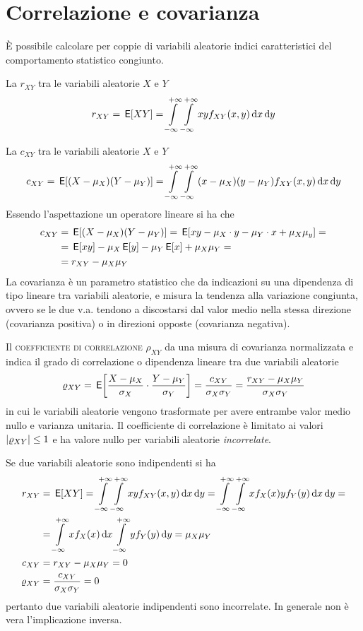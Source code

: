\section{Correlazione e covarianza}
\`{E} possibile calcolare per coppie di variabili aleatorie indici caratteristici del comportamento statistico congiunto.

La  $r_{XY}$ tra le variabili aleatorie $X$ e $Y$
\begin{equation}\label{eq:v_a_correlazione}
r_{XY}=\,{\operatorname{\mathsf{E}}}\!\left[{X Y}\right]=\int\limits_{-\infty}^{+\infty}{\int\limits_{-\infty}^{+\infty}{x y f_{XY}(x,y)}{\,\mathop{}\!\mathrm{d}{x}}}{\,\mathop{}\!\mathrm{d}{y}}
\end{equation}

La  $c_{XY}$ tra le variabili aleatorie $X$ e $Y$
\begin{equation}\label{eq:v_a_covarianza}
c_{XY}=\,{\operatorname{\mathsf{E}}}\!\left[{(X-\mu_X)(Y-\mu_Y)}\right]=\int\limits_{-\infty}^{+\infty}{\int\limits_{-\infty}^{+\infty}{(x-\mu_X)(y-\mu_Y)f_{XY}(x,y)}{\,\mathop{}\!\mathrm{d}{x}}}{\,\mathop{}\!\mathrm{d}{y}}
\end{equation}
Essendo l'aspettazione un operatore lineare si ha che
\begin{equation}\begin{split}
c_{XY}&=\,{\operatorname{\mathsf{E}}}\!\left[{(X-\mu_X)(Y-\mu_Y)}\right]=\,{\operatorname{\mathsf{E}}}\!\left[{x y-\mu_X\cdot y-\mu_Y\cdot x+\mu_X\mu_y}\right]=\\
&=\,{\operatorname{\mathsf{E}}}\!\left[{x y}\right]-\mu_X \,{\operatorname{\mathsf{E}}}\!\left[{y}\right]-\mu_Y \,{\operatorname{\mathsf{E}}}\!\left[{x}\right]+\mu_X\mu_Y=\\&=r_{XY}-\mu_X\mu_Y\end{split}\end{equation}
La covarianza è un parametro statistico che da indicazioni su una dipendenza di tipo lineare tra variabili aleatorie, e misura la tendenza alla variazione congiunta, ovvero se le due v.a. tendono a discostarsi dal valor medio nella stessa direzione (covarianza positiva) o in direzioni opposte (covarianza negativa).

Il \textsc{coefficiente di correlazione} $\rho_{XY}$ da una misura di covarianza normalizzata e indica il grado di correlazione o dipendenza lineare tra due variabili aleatorie
\begin{equation}
\varrho_{XY}=\,{\operatorname{\mathsf{E}}}\!\left[{\frac{X-\mu_X}{\sigma_X}\cdot\frac{Y-\mu_Y}{\sigma_Y}}\right]=\frac{c_{XY}}{\sigma_X\sigma_Y}=\frac{r_{XY}-\mu_X\mu_Y}{\sigma_X\sigma_Y}
\end{equation}
in cui le variabili aleatorie vengono trasformate per avere entrambe valor medio nullo e varianza unitaria. Il coefficiente di correlazione è limitato ai valori $\left|{\varrho_{XY}}\right|\leq 1$ e ha valore nullo per variabili aleatorie \emph{incorrelate}.

Se due variabili aleatorie sono indipendenti si ha
\[\begin{split}
r_{XY}&=\,{\operatorname{\mathsf{E}}}\!\left[{X Y}\right]=\int\limits_{-\infty}^{+\infty}{\int\limits_{-\infty}^{+\infty}{x y f_{XY}(x,y)}{\,\mathop{}\!\mathrm{d}{x}}}{\,\mathop{}\!\mathrm{d}{y}}=\int\limits_{-\infty}^{+\infty}{\int\limits_{-\infty}^{+\infty}{x f_{X}(x) y f_{Y}(y)}{\,\mathop{}\!\mathrm{d}{x}}}{\,\mathop{}\!\mathrm{d}{y}}=\\
&=\int\limits_{-\infty}^{+\infty}{x f_{X}(x)}{\,\mathop{}\!\mathrm{d}{x}}\int\limits_{-\infty}^{+\infty}{y f_{Y}(y)}{\,\mathop{}\!\mathrm{d}{y}}=\mu_X\mu_Y\\
c_{XY}&=r_{XY}-\mu_X\mu_Y=0\\
\varrho_{XY}&=\frac{c_{XY}}{\sigma_X\sigma_Y}=0
\end{split}\]
pertanto due variabili aleatorie indipendenti sono incorrelate. In generale non è vera l'implicazione inversa.

